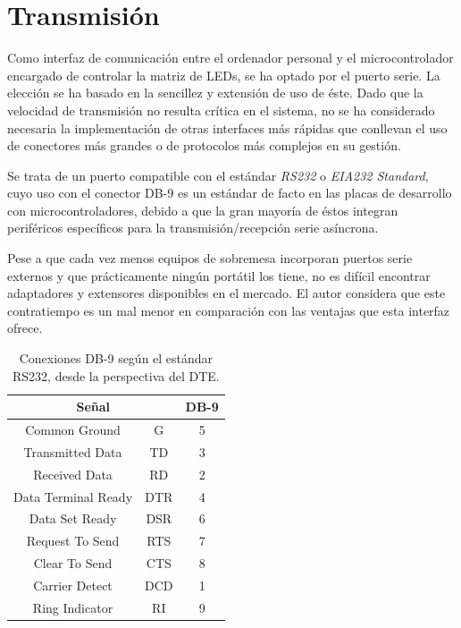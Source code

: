 \section{Transmisión}
\label{sec:transmision}

Como interfaz de comunicación entre el ordenador personal y el microcontrolador encargado de controlar la matriz de LEDs, se ha optado por el puerto serie. La elección se ha basado en la sencillez y extensión de uso de éste. Dado que la velocidad de transmisión no resulta crítica en el sistema, no se ha considerado necesaria la implementación de otras interfaces más rápidas que conllevan el uso de conectores más grandes o de protocolos más complejos en su gestión.

Se trata de un puerto compatible con el estándar \textit{RS232} o \textit{EIA232 Standard}, cuyo uso con el conector DB-9 es un estándar de facto en las placas de desarrollo con microcontroladores, debido a que la gran mayoría de éstos integran periféricos específicos para la transmisión/recepción serie asíncrona.

Pese a que cada vez menos equipos de sobremesa incorporan puertos serie externos y que prácticamente ningún portátil los tiene, no es difícil encontrar adaptadores y extensores disponibles en el mercado. El autor considera que este contratiempo es un mal menor en comparación con las ventajas que esta interfaz ofrece.

\begin{table}[!htp]
\centering
\begin{tabular}[c]{|c|c|c|}
\hline
\multicolumn{2}{|c|}{\textbf{Señal}} & \textbf{DB-9} \\
\hline
Common Ground	    & G   & 5 \\ \hline
Transmitted Data    & TD  & 3 \\ \hline
Received Data	    & RD  & 2 \\ \hline
Data Terminal Ready & DTR & 4 \\ \hline
Data Set Ready	    & DSR & 6 \\ \hline
Request To Send	    & RTS & 7 \\ \hline
Clear To Send	    & CTS & 8 \\ \hline
Carrier Detect	    & DCD & 1 \\ \hline
Ring Indicator	    & RI  & 9 \\
\hline
\end{tabular}
\caption[Conexiones DB-9 según el estándar RS232]{Conexiones DB-9 según el estándar RS232, desde la perspectiva del DTE.}
\label{tab:db9}
\end{table}

